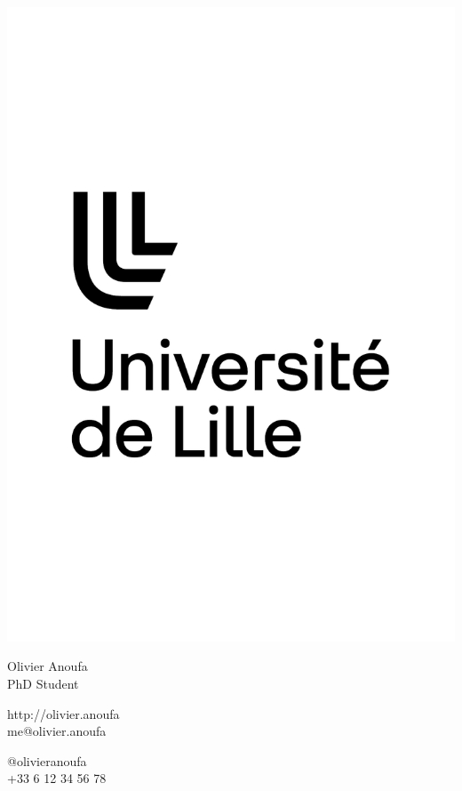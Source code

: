 \documentclass{article}
\begin{document}
\centering \includegraphics[width=.25\linewidth]{logo}\\[5pt]
\parbox{2in}{\Large \centering Olivier Anoufa\\[1pt]
\normalsize PhD Student}

\vfill
\raggedright
\begin{multicols}{2}
http://olivier.anoufa\\
me@olivier.anoufa

\columnbreak
\raggedleft
@olivieranoufa\\
+33 6 12 34 56 78%
\end{multicols}%
\end{document}
